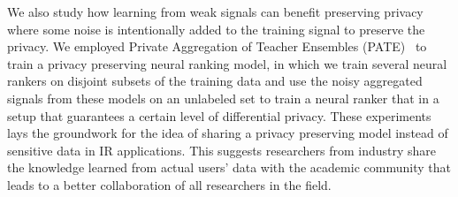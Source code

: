 We also study how learning from weak signals can benefit preserving privacy where some noise is intentionally added to the training signal to preserve the privacy. We employed Private Aggregation of Teacher Ensembles (PATE)~\citep{Papernot:2017}  to train a privacy preserving neural ranking model, in which we train several neural rankers on disjoint subsets of the training data and use the noisy aggregated signals from these models on an unlabeled set to train a neural ranker that in a setup that guarantees a certain level of differential privacy.
These experiments lays the groundwork for the idea of sharing a privacy preserving model instead of sensitive data in IR applications. This suggests researchers from industry share the knowledge learned from actual users' data with the academic community that leads to a better collaboration of all researchers in the field. 